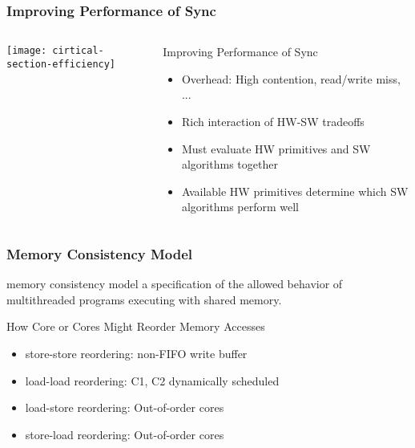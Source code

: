     
\begin{frame}[plain]	
    \frametitle{Improving Performance of Sync}
    
    
    \begin{columns}
        
        \begin{column}{.4\textwidth}
            \texttt{[image: cirtical-section-efficiency]}
        \end{column}
        \begin{column}{.6\textwidth}	
            
            Improving Performance of Sync
            \begin{itemize}
                \item Overhead: High contention, read/write miss, ...
                
                \item  Rich interaction of HW-SW tradeoffs
                \item Must evaluate HW primitives and SW algorithms together
                \item Available HW primitives determine which SW algorithms perform well				                
            \end{itemize}		
        \end{column}
    \end{columns}
    
\end{frame}

    
\begin{frame}[plain]	
    \frametitle{Memory Consistency Model}
    
    \begin{block}{memory consistency model}
        a specification of the allowed    behavior of multithreaded programs executing with shared memory. 
    \end{block} 

    How Core or Cores Might Reorder Memory Accesses
     \begin{itemize}
        \item store-store reordering: non-FIFO write buffer    
        \item load-load reordering: C1, C2 dynamically scheduled
        \item load-store reordering:  Out-of-order cores
        \item store-load reordering:  Out-of-order cores			                
    \end{itemize}
\end{frame}

